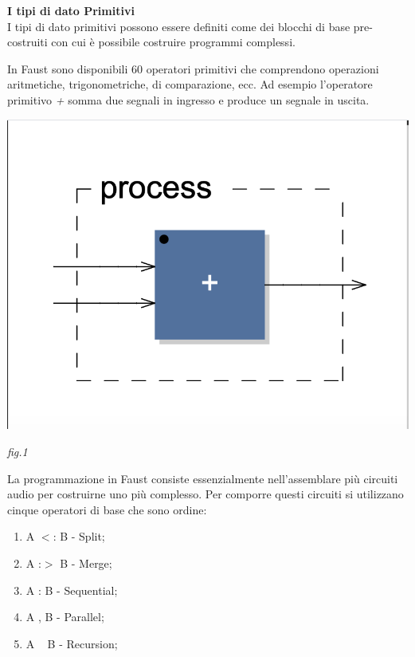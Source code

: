 \documentclass[11pt]{article}
\begin{document}
\begin{multicols*}{2}
\parskip=0pt

\textbf{I tipi di dato Primitivi}\\

I tipi di dato primitivi possono essere definiti come dei blocchi di base pre-costruiti con cui è possibile costruire programmi complessi.

In Faust sono disponibili 60 operatori primitivi che comprendono operazioni aritmetiche, trigonometriche, di comparazione, ecc. Ad esempio l'operatore primitivo \textit{+} somma due segnali in ingresso e produce un segnale in uscita. \\

\begin{center}
\includegraphics[scale=0.3]{img/01.png}

{\scriptsize \emph{fig.1 }}
\end{center}

La programmazione in Faust consiste essenzialmente nell'assemblare più circuiti audio per costruirne uno più complesso. Per comporre questi circuiti si utilizzano cinque operatori di base che sono ordine:

\begin{enumerate}
\scriptsize
\item A $<$: B - Split; 
\item A :$>$ B - Merge; 
\item A : B - Sequential;
\item A , B - Parallel;
\item A ~ B - Recursion;
\end{enumerate}


\end{multicols*}
\end{document}
